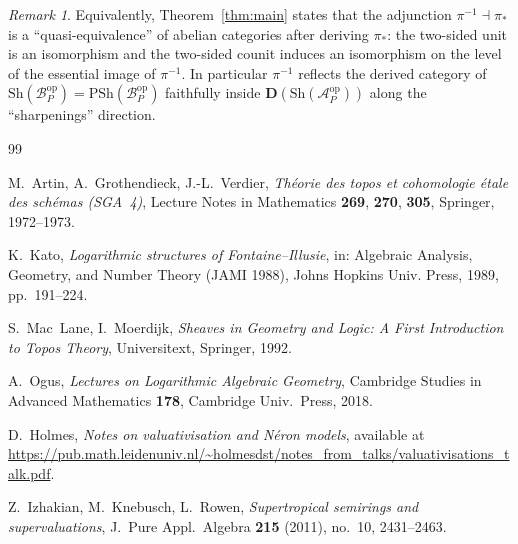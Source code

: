 \documentclass[11pt]{article}
\theoremstyle{definition}
\theoremstyle{remark}
\newtheorem{remark}[theorem]{Remark}
\newcommand{\Sh}{\mathrm{Sh}}
\newcommand{\PSh}{\mathrm{PSh}}
\newcommand{\Acal}{\mathcal{A}}
\newcommand{\Bcal}{\mathcal{B}}
\newcommand{\op}{\mathrm{op}}
\begin{document}
\begin{remark}
Equivalently, Theorem~\ref{thm:main} states that the adjunction
$\pi^{-1} \dashv \pi_*$ is a ``quasi-equivalence'' of abelian categories after
deriving $\pi_*$: the two-sided unit is an isomorphism and the two-sided
counit induces an isomorphism on the level of the essential image of
$\pi^{-1}$.  In particular $\pi^{-1}$ reflects the derived category of
$\Sh(\Bcal_P^{\op}) = \PSh(\Bcal_P^{\op})$ faithfully inside
$\mathbf{D}(\Sh(\Acal_P^{\op}))$ along the ``sharpenings'' direction.
\end{remark}

\begin{thebibliography}{99}

M.~Artin, A.~Grothendieck, J.-L.~Verdier,
\emph{Th\'eorie des topos et cohomologie \'etale des sch\'emas (SGA~4)},
Lecture Notes in Mathematics \textbf{269}, \textbf{270}, \textbf{305},
Springer, 1972--1973.

K.~Kato,
\emph{Logarithmic structures of Fontaine--Illusie},
in: Algebraic Analysis, Geometry, and Number Theory (JAMI 1988),
Johns Hopkins Univ. Press, 1989, pp.~191--224.

S.~Mac~Lane, I.~Moerdijk,
\emph{Sheaves in Geometry and Logic: A First Introduction to Topos Theory},
Universitext, Springer, 1992.

A.~Ogus,
\emph{Lectures on Logarithmic Algebraic Geometry},
Cambridge Studies in Advanced Mathematics \textbf{178}, Cambridge Univ.\ Press,
2018.

D.~Holmes,
\emph{Notes on valuativisation and N\'eron models},
available at
\url{https://pub.math.leidenuniv.nl/~holmesdst/notes_from_talks/valuativisations_talk.pdf}.

Z.~Izhakian, M.~Knebusch, L.~Rowen,
\emph{Supertropical semirings and supervaluations},
J.~Pure Appl.\ Algebra \textbf{215} (2011), no.~10, 2431--2463.

\end{thebibliography}
\end{document}
